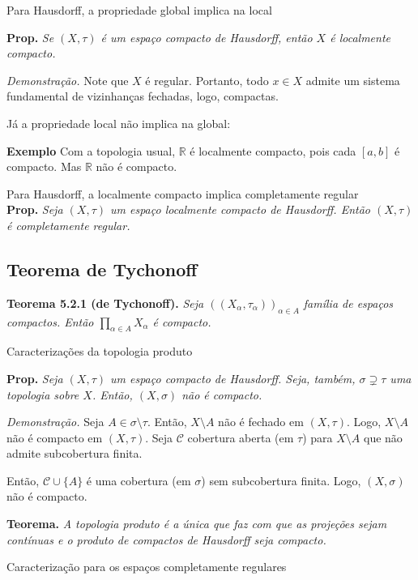 \documentclass{article}
\begin{document}
\begin{landscape}
\begin{multicols}{3}
\color{Emerald}Para Hausdorff, a propriedade global implica na local\color{black}

\textbf{Prop.} \textit{Se $(X, \tau)$ é um espaço compacto de Hausdorff, então $X$ é localmente compacto.}\medskip

\textit{Demonstração.} Note que $X$ é regular. Portanto, todo $x \in X$ admite um sistema fundamental de vizinhanças fechadas, logo, compactas.   \medskip

\color{Emerald}Já a propriedade local não implica na global:\color{black}

\textbf{Exemplo} Com a topologia usual, $\mathbb{R}$ é localmente compacto, pois cada $[a, b]$ é compacto. Mas $\mathbb{R}$ não é compacto.\medskip

\color{Emerald}Para Hausdorff, a localmente compacto implica completamente regular\color{black}\\
\textbf{Prop.} \textit{Seja $(X, \tau)$ um espaço localmente compacto de Hausdorff. Então $(X, \tau)$ é completamente regular.}


\subsection{Teorema de Tychonoff}
\textbf{Teorema 5.2.1 (de Tychonoff).} \textit{Seja \(((X_\alpha, \tau_\alpha))_{\alpha \in A}\) família de espaços compactos. Então \(\prod_{\alpha \in A} X_\alpha\) é compacto.}\medskip

\colorbox{cinza}{Caracterizações da topologia produto}\medskip

\textbf{Prop.}\textit{ Seja $(X, \tau)$ um espaço compacto de Hausdorff. Seja, também, $\sigma \supsetneq \tau$ uma topologia sobre $X$. Então, $(X, \sigma)$ não é compacto.}

\textit{Demonstração.} Seja $A \in \sigma \setminus \tau$. Então, $X \setminus A$ não é fechado em $(X, \tau)$. Logo, $X \setminus A$ não é compacto em $(X, \tau)$. Seja $\mathcal{C}$ cobertura aberta (em $\tau$) para $X \setminus A$ que não admite subcobertura finita.

Então, $\mathcal{C} \cup \{A\}$ é uma cobertura (em $\sigma$) sem subcobertura finita. Logo, $(X, \sigma)$ não é compacto.\medskip   


\textbf{Teorema.} \textit{A topologia produto é a única que faz com que as projeções sejam contínuas e o produto de compactos de Hausdorff seja compacto.}\medskip

\colorbox{cinza}{Caracterização para os espaços completamente regulares}\medskip


\end{multicols}
\end{landscape}
\end{document}
